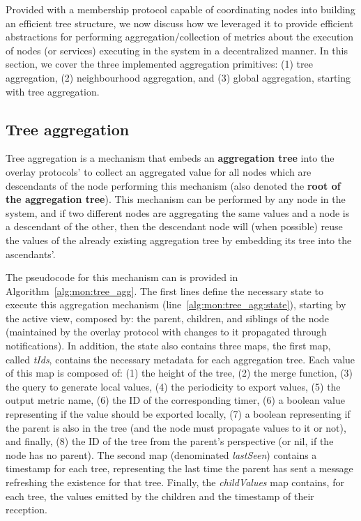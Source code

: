 
Provided with a membership protocol capable of coordinating nodes into building an efficient tree structure, we now discuss how we leveraged it to provide efficient abstractions for performing aggregation/collection of metrics about the execution of nodes (or services) executing in the system in a decentralized manner. In this section, we cover the three implemented aggregation primitives: (1) tree aggregation, (2) neighbourhood aggregation, and (3) global aggregation, starting with tree aggregation.

\subsection{Tree aggregation} \label{sec:mon_protocol:tree_agg}

Tree aggregation is a mechanism that embeds an \textbf{aggregation tree} into the overlay protocols' to collect an aggregated value for all nodes which are descendants of the node performing this mechanism (also denoted the \textbf{root of the aggregation tree}). This mechanism can be performed by any node in the system, and if two different nodes are aggregating the same values and a node is a descendant of the other, then the descendant node will (when possible) reuse the values of the already existing aggregation tree by embedding its tree into the ascendants'.

The pseudocode for this mechanism can is provided in Algorithm~\ref{alg:mon:tree_agg}. The first lines define the necessary state to execute this aggregation mechanism (line~\ref{alg:mon:tree_agg:state}), starting by the active view, composed by: the parent, children, and siblings of the node (maintained by the overlay protocol with changes to it propagated through notifications). In addition, the state also contains three maps, the first map, called \textit{tIds}, contains the necessary metadata for each aggregation tree. Each value of this map is composed of: (1) the height of the tree, (2) the merge function, (3) the query to generate local values, (4) the periodicity to export values, (5) the output metric name, (6) the ID of the corresponding timer, (6) a boolean value representing if the value should be exported locally, (7) a boolean representing if the parent is also in the tree (and the node must propagate values to it or not), and finally, (8) the ID of the tree from the parent's perspective (or nil, if the node has no parent). The second map (denominated \textit{lastSeen}) contains a timestamp for each tree, representing the last time the parent has sent a message refreshing the existence for that tree. Finally, the \textit{childValues} map contains, for each tree, the values emitted by the children and the timestamp of their reception.

